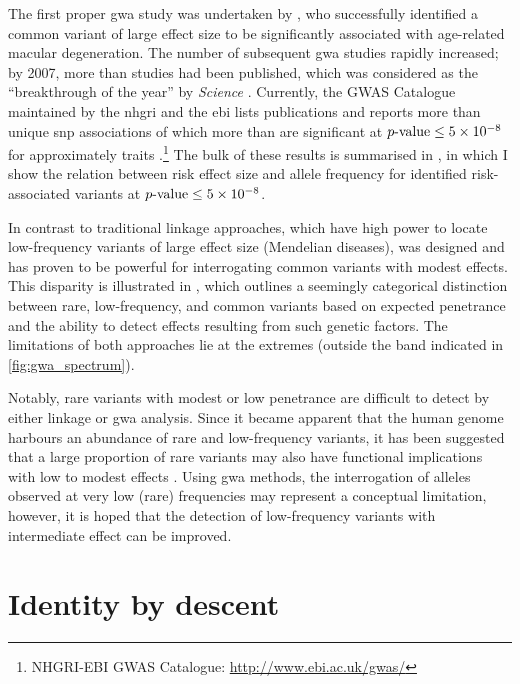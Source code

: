 %

%

The first proper \gls{gwa} study was undertaken by \citet{Klein:2005dn}, who successfully identified a common variant of large effect size to be significantly associated with age-related macular degeneration.
The number of subsequent \gls{gwa} studies rapidly increased; by 2007, more than  studies had been published, which was considered as the ``breakthrough of the year'' by \textsl{Science} \citep{Pennisi:2007cs}.
Currently, the GWAS Catalogue maintained by the \gls{nhgri} and the \gls{ebi} lists  publications and reports more than  unique \gls{snp} associations of which more than  are significant at ${\mbox{$p$-value}\leq\num{5e-8}}$ for approximately  traits \citep{burdett2016nhgri}.\footnote{NHGRI-EBI GWAS Catalogue: \url{http://www.ebi.ac.uk/gwas/} }
The bulk of these results is summarised in , in which I show the relation between risk effect size and allele frequency for identified risk-associated variants at ${\mbox{$p$-value}\leq\num{5e-8}}$.

%

%

In contrast to traditional linkage approaches, which have high power to locate low-frequency variants of large effect size (\eg Mendelian diseases),  was designed and has proven to be powerful for interrogating common variants with modest effects.
This disparity is illustrated in , which outlines a seemingly categorical distinction between rare, low-frequency, and common variants based on expected penetrance and the ability to detect effects resulting from such genetic factors.
The limitations of both approaches lie at the extremes (outside the band indicated in \cref{fig:gwa_spectrum}).

Notably, rare variants with modest or low penetrance are difficult to detect by either linkage or \gls{gwa} analysis.
Since it became apparent that the human genome harbours an abundance of rare and low-frequency variants, it has been suggested that a large proportion of rare variants may also have functional implications with low to modest effects \citep{Coventry:2010cqa,Keinan:2012kl,Tennessen:2012ck}.
Using \gls{gwa} methods, the interrogation of alleles observed at very low (rare) frequencies may represent a conceptual limitation, however, it is hoped that the detection of low-frequency variants with intermediate effect can be improved.


%
\section{Identity by descent}
\label{sec:ibd_definition}
%

